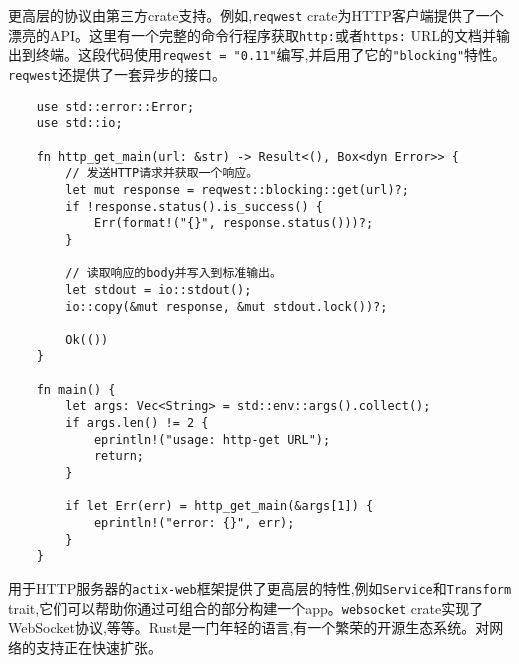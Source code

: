 更高层的协议由第三方crate支持。例如,\texttt{reqwest} crate为HTTP客户端提供了一个漂亮的API。这里有一个完整的命令行程序获取\texttt{http:}或者\texttt{https:} URL的文档并输出到终端。这段代码使用\texttt{reqwest = "0.11"}编写,并启用了它的\texttt{"blocking"}特性。\texttt{reqwest}还提供了一套异步的接口。
\begin{verbatim}
    use std::error::Error;
    use std::io;

    fn http_get_main(url: &str) -> Result<(), Box<dyn Error>> {
        // 发送HTTP请求并获取一个响应。
        let mut response = reqwest::blocking::get(url)?;
        if !response.status().is_success() {
            Err(format!("{}", response.status()))?;
        }

        // 读取响应的body并写入到标准输出。
        let stdout = io::stdout();
        io::copy(&mut response, &mut stdout.lock())?;

        Ok(())
    }

    fn main() {
        let args: Vec<String> = std::env::args().collect();
        if args.len() != 2 {
            eprintln!("usage: http-get URL");
            return;
        }

        if let Err(err) = http_get_main(&args[1]) {
            eprintln!("error: {}", err);
        }
    }
\end{verbatim}

用于HTTP服务器的\texttt{actix-web}框架提供了更高层的特性,例如\texttt{Service}和\texttt{Transform} trait,它们可以帮助你通过可组合的部分构建一个app。\texttt{websocket} crate实现了WebSocket协议,等等。Rust是一门年轻的语言,有一个繁荣的开源生态系统。对网络的支持正在快速扩张。
